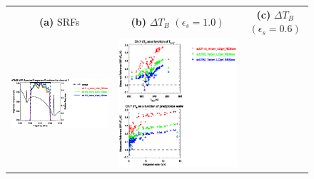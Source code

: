 \begin{figure}[H]
  \centering
  \begin{tabular}{c c c}
    \textsf{\textbf{(a)} SRFs} &
    \textsf{\textbf{(b)} $\Delta T_B$ $(\epsilon_s = 1.0)$} &
    \textsf{\textbf{(c)} $\Delta T_B$ $(\epsilon_s = 0.6)$} \\
    \includegraphics[bb=80 400 280 558,clip,scale=0.85]{graphics/srf/Tset/atms_npp.ch7.osrf.eps} &
    \includegraphics[bb=85 400 260 558,clip,scale=0.85]{graphics/dtb/Tset/e1.0_r0.0/atms_npp.ch7.dTb.eps} & 

\end{tabular}
\end{figure}

